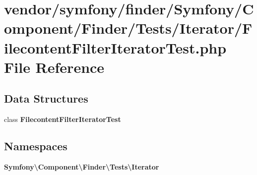 \section{vendor/symfony/finder/\+Symfony/\+Component/\+Finder/\+Tests/\+Iterator/\+Filecontent\+Filter\+Iterator\+Test.php File Reference}
\label{_filecontent_filter_iterator_test_8php}
\subsection*{Data Structures}
\begin{DoxyCompactItemize}
\item 
class {\bf Filecontent\+Filter\+Iterator\+Test}
\end{DoxyCompactItemize}
\subsection*{Namespaces}
\begin{DoxyCompactItemize}
\item 
 {\bf Symfony\textbackslash{}\+Component\textbackslash{}\+Finder\textbackslash{}\+Tests\textbackslash{}\+Iterator}
\end{DoxyCompactItemize}
